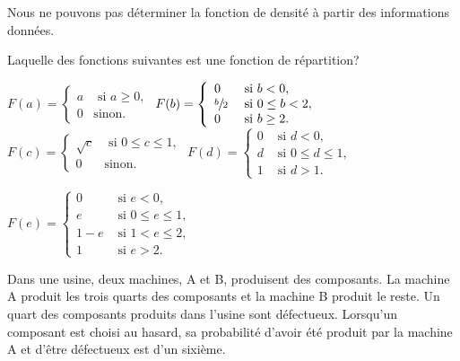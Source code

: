\begin{questions}
\begin{checkboxes}
\choice Nous ne pouvons pas déterminer la fonction de densité à partir des informations données.

\end{checkboxes}
\newpage

\question[3]\label{normaleBivariee}
Laquelle des fonctions suivantes est une fonction de répartition? 

\begin{checkboxes}
\choice $F(a)=\left\{
			\begin{array}{ll}
			a  & \mbox{ si } a \ge 0, \\
			0 & \mbox{sinon.}
			\end{array}
			\right. $
		\vspace{0.3cm}
\correctchoice $ F(b) = \left\{
			\begin{array}{ll}
			0  & \mbox{ si } b<0, \\
			\displaystyle \sfrac{b}{2} & \mbox{ si } 0\leq b < 2,\\
			0 & \mbox{ si } b \geq 2.
			\end{array}
			\right. $
\choice $ F(c) = \left\{
			\begin{array}{ll}
			\sqrt{c}  & \mbox{ si } 0\leq c\leq 1, \\
			0 & \mbox{sinon.}
			\end{array}
			\right. $
\choice $ F(d) = \left\{
			\begin{array}{ll}
			0  & \mbox{ si } d < 0, \\
			d & \mbox{ si } 0 \leq d \leq 1,\\
			1 &  \mbox{ si } d > 1.
			\end{array}
			\right. $

   \choice $ F(e) = \left\{
			\begin{array}{ll}
			0  & \mbox{ si } e < 0, \\
			e & \mbox{ si } 0 \leq e \leq 1,\\
                1-e & \mbox{ si } 1< e \leq 2,\\ 
			1 &  \mbox{ si } e> 2.
			\end{array}
			\right. $
\end{checkboxes}

\question\label{module1_2} 
Dans une usine, deux machines, A et B, produisent des composants. La machine A produit les trois quarts des composants et la machine B produit le reste. Un quart des composants produits dans l'usine sont défectueux. Lorsqu'un composant est choisi au hasard, sa probabilité d'avoir été produit par la machine A et d'être défectueux est d'un sixième. 


\end{questions}
